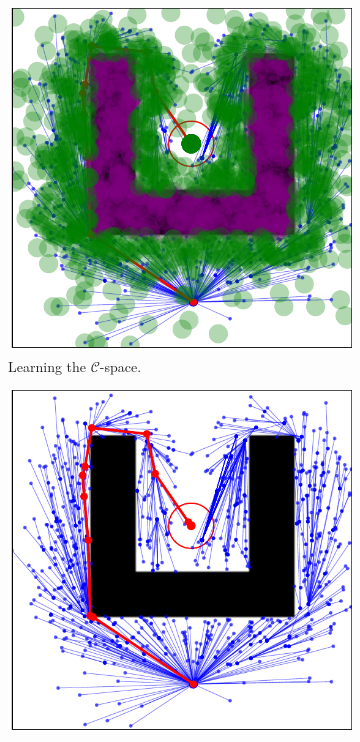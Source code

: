 \documentclass{ctuthesis}
\begin{document}
\begin{figure}[!ht]
  \centering 
  \begin{subfigure}[b]{0.45\textwidth}
      \includegraphics[width=\textwidth]{figChap4/RRTstarML_learning206.0.pdf}
      \caption{Learning the $\mathcal{C}$-space.}
      \label{fig:rrtstarML_learning}
  \end{subfigure}  
  \begin{subfigure}[b]{0.45\textwidth}
      \includegraphics[width=\textwidth]{figChap4/RRTstarML_maze206.0.pdf}

\end{subfigure}
\end{figure}
\end{document}
